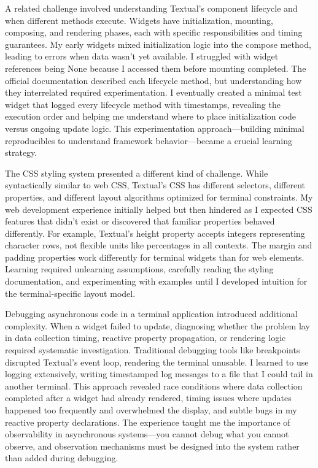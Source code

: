 \documentclass[12pt,a4paper]{article}
\begin{document}
A related challenge involved understanding Textual's component lifecycle and when different methods execute. Widgets have initialization, mounting, composing, and rendering phases, each with specific responsibilities and timing guarantees. My early widgets mixed initialization logic into the compose method, leading to errors when data wasn't yet available. I struggled with widget references being None because I accessed them before mounting completed. The official documentation described each lifecycle method, but understanding how they interrelated required experimentation. I eventually created a minimal test widget that logged every lifecycle method with timestamps, revealing the execution order and helping me understand where to place initialization code versus ongoing update logic. This experimentation approach—building minimal reproducibles to understand framework behavior—became a crucial learning strategy.

The CSS styling system presented a different kind of challenge. While syntactically similar to web CSS, Textual's CSS has different selectors, different properties, and different layout algorithms optimized for terminal constraints. My web development experience initially helped but then hindered as I expected CSS features that didn't exist or discovered that familiar properties behaved differently. For example, Textual's height property accepts integers representing character rows, not flexible units like percentages in all contexts. The margin and padding properties work differently for terminal widgets than for web elements. Learning required unlearning assumptions, carefully reading the styling documentation, and experimenting with examples until I developed intuition for the terminal-specific layout model.

Debugging asynchronous code in a terminal application introduced additional complexity. When a widget failed to update, diagnosing whether the problem lay in data collection timing, reactive property propagation, or rendering logic required systematic investigation. Traditional debugging tools like breakpoints disrupted Textual's event loop, rendering the terminal unusable. I learned to use logging extensively, writing timestamped log messages to a file that I could tail in another terminal. This approach revealed race conditions where data collection completed after a widget had already rendered, timing issues where updates happened too frequently and overwhelmed the display, and subtle bugs in my reactive property declarations. The experience taught me the importance of observability in asynchronous systems—you cannot debug what you cannot observe, and observation mechanisms must be designed into the system rather than added during debugging.
\end{document}
